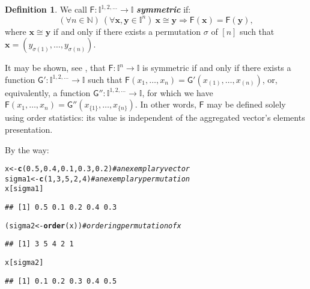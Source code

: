 \documentclass[11pt]{article}\usepackage[]{graphicx}\usepackage[]{color}
\makeatletter
\newcommand{\hlnum}[1]{\textcolor[rgb]{0.686,0.059,0.569}{#1}}%
\newcommand{\hlcom}[1]{\textcolor[rgb]{0.678,0.584,0.686}{\textit{#1}}}%
\newcommand{\hlstd}[1]{\textcolor[rgb]{0.345,0.345,0.345}{#1}}%
\newcommand{\hlkwb}[1]{\textcolor[rgb]{0.69,0.353,0.396}{#1}}%
\newcommand{\hlkwd}[1]{\textcolor[rgb]{0.737,0.353,0.396}{\textbf{#1}}}%
\newenvironment{kframe}{%
 \def\at@end@of@kframe{}%
 \ifinner\ifhmode%
  \def\at@end@of@kframe{\end{minipage}}%
  \begin{minipage}{\columnwidth}%
 \fi\fi%
 \def\FrameCommand##1{\hskip\@totalleftmargin \hskip-\fboxsep
 \colorbox{shadecolor}{##1}\hskip-\fboxsep
     \hskip-\linewidth \hskip-\@totalleftmargin \hskip\columnwidth}%
 \MakeFramed {\advance\hsize-\width
   \@totalleftmargin\z@ \linewidth\hsize
   \@setminipage}}%
 {\par\unskip\endMakeFramed%
 \at@end@of@kframe}
\newenvironment{knitrout}{}{} %
\renewcommand{\emph}[1]{\textbf{\textsl{#1}}}
\newcommand{\vect}[1]{{\mathbf{#1}}}
\newcommand{\func}[1]{{\mathsf{#1}}}
\newcommand{\Ival}{\mathbb{I}}
\newcommand{\IvalPow}[1]{\mathbb{I}^{#1}}
\newcommand{\AnyPow}{^{1,2,\dots}}
\newcommand{\IvalAnyPow}{\mathbb{I}\AnyPow}
\theoremstyle{remark}
\theoremstyle{definition}
\newtheorem{definition}[theorem]{Definition}
\makeatother
\begin{document}
\begin{definition}
We call $\func{F}: \IvalAnyPow\to\Ival$ \emph{symmetric} if:
\[
(\forall n\in\mathbb{N})\ (\forall \vect{x},\vect{y}\in\IvalPow{n})\
\vect{x}\cong\vect{y}\Longrightarrow\func{F}(\vect{x})=\func{F}(\vect{y}),
 \]
 where  $\vect{x}\cong\vect{y}$ if and only if there exists a permutation
$\sigma$ of $[n]$ such that
$\vect{x}=(y_{\sigma(1)},\dots,y_{\sigma(n)})$.
\end{definition}

It may be shown, see
\cite[Thm.~2.34]{GrabischETAL2009:aggregationfunctions}, that
$\func{F}:\IvalPow{n}\to\Ival$ is symmetric if and only if there exists
a function $\func{G}':\IvalAnyPow\to\Ival$ such that
$\func{F}(x_{1},\dots,x_{n})=\func{G}'(x_{(1)},\dots,x_{(n)})$,
or, equivalently, a function $\func{G}'':\IvalAnyPow\to\Ival$,
for which we have
$\func{F}(x_{1},\dots,x_{n})=\func{G}''(x_{\{1\}},\dots,x_{\{n\}})$.
In other words, $\func{F}$
may be defined solely using order statistics:
its value is independent
of the aggregated vector's elements presentation.


By the way:

\begin{knitrout}\small
{}\color{fgcolor}\begin{kframe}
\begin{alltt}
\hlstd{x} \hlkwb{<-} \hlkwd{c}\hlstd{(}\hlnum{0.5}\hlstd{,} \hlnum{0.4}\hlstd{,} \hlnum{0.1}\hlstd{,} \hlnum{0.3}\hlstd{,} \hlnum{0.2}\hlstd{)} \hlcom{# an exemplary vector}
\hlstd{sigma1} \hlkwb{<-} \hlkwd{c}\hlstd{(}\hlnum{1}\hlstd{,} \hlnum{3}\hlstd{,} \hlnum{5}\hlstd{,} \hlnum{2}\hlstd{,} \hlnum{4}\hlstd{)} \hlcom{# an exemplary permutation}
\hlstd{x[sigma1]}
\end{alltt}
\begin{verbatim}
## [1] 0.5 0.1 0.2 0.4 0.3
\end{verbatim}
\begin{alltt}
\hlstd{(sigma2} \hlkwb{<-} \hlkwd{order}\hlstd{(x))} \hlcom{# ordering permutation of x}
\end{alltt}
\begin{verbatim}
## [1] 3 5 4 2 1
\end{verbatim}
\begin{alltt}
\hlstd{x[sigma2]}
\end{alltt}
\begin{verbatim}
## [1] 0.1 0.2 0.3 0.4 0.5
\end{verbatim}
\end{kframe}
\end{knitrout}
\end{document}

